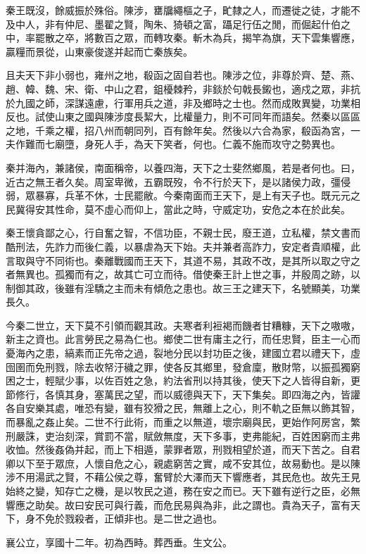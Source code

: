 秦王既沒，餘威振於殊俗。陳涉，罋牖繩樞之子，甿隸之人，而遷徙之徒，才能不及中人，非有仲尼、墨翟之賢，陶朱、猗頓之富，躡足行伍之閒，而倔起什伯之中，率罷散之卒，將數百之眾，而轉攻秦。斬木為兵，揭竿為旗，天下雲集響應，贏糧而景從，山東豪俊遂并起而亡秦族矣。

且夫天下非小弱也，雍州之地，殽函之固自若也。陳涉之位，非尊於齊、楚、燕、趙、韓、魏、宋、衛、中山之君，鉏櫌棘矜，非錟於句戟長鎩也，適戍之眾，非抗於九國之師，深謀遠慮，行軍用兵之道，非及鄉時之士也。然而成敗異變，功業相反也。試使山東之國與陳涉度長絜大，比權量力，則不可同年而語矣。然秦以區區之地，千乘之權，招八州而朝同列，百有餘年矣。然後以六合為家，殽函為宮，一夫作難而七廟墮，身死人手，為天下笑者，何也。仁義不施而攻守之勢異也。

秦并海內，兼諸侯，南面稱帝，以養四海，天下之士斐然鄉風，若是者何也。曰，近古之無王者久矣。周室卑微，五霸既歿，令不行於天下，是以諸侯力政，彊侵弱，眾暴寡，兵革不休，士民罷敝。今秦南面而王天下，是上有天子也。既元元之民冀得安其性命，莫不虛心而仰上，當此之時，守威定功，安危之本在於此矣。

秦王懷貪鄙之心，行自奮之智，不信功臣，不親士民，廢王道，立私權，禁文書而酷刑法，先詐力而後仁義，以暴虐為天下始。夫并兼者高詐力，安定者貴順權，此言取與守不同術也。秦離戰國而王天下，其道不易，其政不改，是其所以取之守之者無異也。孤獨而有之，故其亡可立而待。借使秦王計上世之事，并殷周之跡，以制御其政，後雖有淫驕之主而未有傾危之患也。故三王之建天下，名號顯美，功業長久。

今秦二世立，天下莫不引領而觀其政。夫寒者利裋褐而饑者甘糟糠，天下之嗷嗷，新主之資也。此言勞民之易為仁也。鄉使二世有庸主之行，而任忠賢，臣主一心而憂海內之患，縞素而正先帝之過，裂地分民以封功臣之後，建國立君以禮天下，虛囹圉而免刑戮，除去收帑汙穢之罪，使各反其鄉里，發倉廩，散財幣，以振孤獨窮困之士，輕賦少事，以佐百姓之急，約法省刑以持其後，使天下之人皆得自新，更節修行，各慎其身，塞萬民之望，而以威德與天下，天下集矣。即四海之內，皆讙各自安樂其處，唯恐有變，雖有狡猾之民，無離上之心，則不軌之臣無以飾其智，而暴亂之姦止矣。二世不行此術，而重之以無道，壞宗廟與民，更始作阿房宮，繁刑嚴誅，吏治刻深，賞罰不當，賦斂無度，天下多事，吏弗能紀，百姓困窮而主弗收恤。然後姦偽并起，而上下相遁，蒙罪者眾，刑戮相望於道，而天下苦之。自君卿以下至于眾庶，人懷自危之心，親處窮苦之實，咸不安其位，故易動也。是以陳涉不用湯武之賢，不藉公侯之尊，奮臂於大澤而天下響應者，其民危也。故先王見始終之變，知存亡之機，是以牧民之道，務在安之而已。天下雖有逆行之臣，必無響應之助矣。故曰安民可與行義，而危民易與為非，此之謂也。貴為天子，富有天下，身不免於戮殺者，正傾非也。是二世之過也。

襄公立，享國十二年。初為西畤。葬西垂。生文公。

